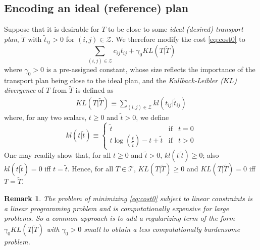 \documentclass[twocolumn]{article}
\newtheorem{remark}{Remark}
\begin{document}
\subsection{Encoding an ideal (reference) plan}
Suppose that it is desirable for $T$ to be close to some {\em ideal (desired) transport plan}, $\tilde{T}$
with 
 $\tilde{t}_{ij} >0$ for $(i,j) \in \mathcal{Z}$.
We therefore  modify 
the cost \eqref{eq:cost0} to
\begin{equation}
\label{eq:newJ}
\sum_{(i,j) \in \mathcal{Z}} c _{ij} t_{ij} +\gamma_0 KL(T|\tilde{T})
\end{equation}
where  $\gamma_0 >0$ is a {pre-assigned  constant, whose size reflects the importance of the transport plan being close to the ideal plan}, and the {\em Kullback-Leibler ($KL$) divergence} of $T$ from $\tilde{T}$ is defined as
\begin{align}
KL(T| \tilde{T}) \equiv   \sum_{(i,j) \in \mathcal{Z}}  kl(t_{ij}|\tilde{t}_{ij})	
\label{eq:KL}
\end{align}
where,  for any two scalars, $t\ge 0$ and $\tilde{t}>0$, we define
\begin{equation}
kl(t|\tilde{t}) \equiv
\left\{\begin{array}{ccc}
\tilde{t}	&\text{if}	& t = 0	\\
\displaystyle{ t \log \left(\frac{t}{\tilde{t}}\right)} -t + \tilde{t}	& \text{if}	& t >0
\end{array}
\right.
\end{equation}
One may readily show that,  for all $t\ge0$ and $\tilde{t}>0$,  $kl(t|\tilde{t}) \ge 0$; also $kl(t|\tilde{t}) =0$ iff  $t=\tilde{t}$. Hence, for all $T\in \mathcal{T}$,  $KL(T|\tilde{T}) \ge 0$ and $KL(T|\tilde{T}) =0$ iff $T=\tilde{T}$.

\begin{remark}
The problem of minimizing \eqref{eq:cost0} subject to linear constraints is a linear programming problem and is computationally expensive for large problems. So a common approach is to add a regularizing term of the form $\gamma_0 KL(T|\tilde{T})$ 
with $\gamma_0>0$ small to obtain a less computationally burdensome problem.
\end{remark}
\end{document}
